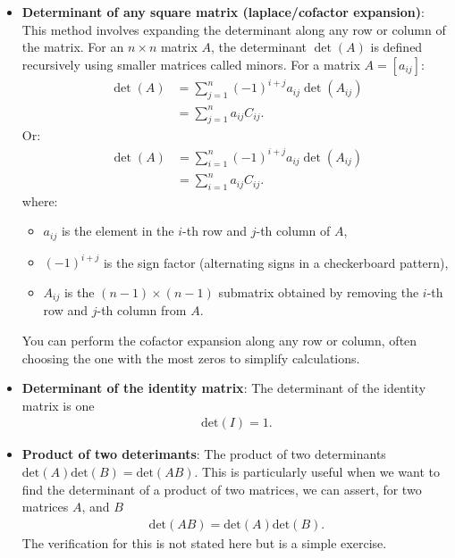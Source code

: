 \documentclass{report}
\begin{document}
\begin{itemize}
    \item \textbf{Determinant of any square matrix (laplace/cofactor expansion)}: This method involves expanding the determinant along any row or column of the matrix. For an \( n \times n \) matrix \( A \), the determinant \( \det(A) \) is defined recursively using smaller matrices called minors.
        \bigbreak \noindent 
        For a matrix \( A = [a_{ij}]\):
        \begin{align*}
            \det(A) &= \sum_{j=1}^{n} (-1)^{i+j} a_{ij} \det(A_{ij}) \\
                    &= \sum_{j=1}^{n} a_{ij}C_{ij}
        .\end{align*}
        Or:
        \begin{align*}
            \det(A) &= \sum_{i=1}^{n} (-1)^{i+j} a_{ij} \det(A_{ij}) \\
                    &= \sum_{i=1}^{n} a_{ij}C_{ij}
        .\end{align*}
        where:
        \begin{itemize}
            \item \( a_{ij} \) is the element in the \( i \)-th row and \( j \)-th column of \( A \),
            \item \( (-1)^{i+j} \) is the sign factor (alternating signs in a checkerboard pattern),
            \item \( A_{ij} \) is the \( (n-1) \times (n-1) \) submatrix obtained by removing the \( i \)-th row and \( j \)-th column from \( A \).
        \end{itemize}
        You can perform the cofactor expansion along any row or column, often choosing the one with the most zeros to simplify calculations.
    \item \textbf{Determinant of the identity matrix}: The determinant of the identity matrix is one 
        \begin{align*}
            \text{det}(I) = 1
        .\end{align*}
    \item \textbf{Product of two deterimants}: The product of two determinants $\text{det}(A)\text{det}(B) = \text{det}(AB)$. This is particularly useful when we want to find the determinant of a product of two matrices, we can assert, for two matrices $A$, and $B$
        \begin{align*}
            \text{det}(AB) = \text{det}(A)\text{det}(B)        
        .\end{align*}
        \bigbreak \noindent 
        The verification for this is not stated here but is a simple exercise. 

\end{itemize}
\end{document}
